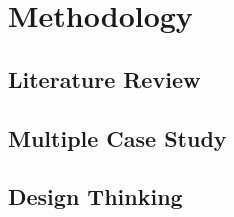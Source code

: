 \chapter{Methodology} \label{chapter3}

\section{Literature Review}

\section{Multiple Case Study}

\section{Design Thinking}